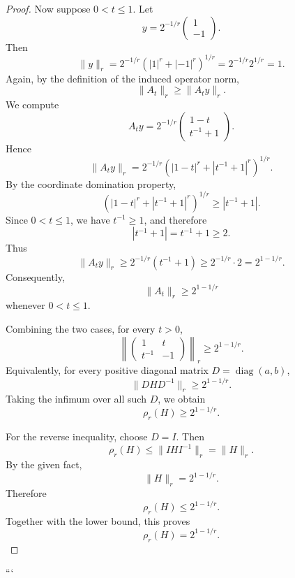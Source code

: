 \begin{proof}
Now suppose \(0<t\leq 1\). Let
\[
y=2^{-1/r}\begin{pmatrix}1\\-1\end{pmatrix}.
\]
Then
\[
\|y\|_r
=
2^{-1/r}\left(|1|^r+|-1|^r\right)^{1/r}
=
2^{-1/r}2^{1/r}
=
1.
\]
Again, by the definition of the induced operator norm,
\[
\|A_t\|_r \geq \|A_t y\|_r.
\]
We compute
\[
A_t y
=
2^{-1/r}
\begin{pmatrix}
1-t\\
t^{-1}+1
\end{pmatrix}.
\]
Hence
\[
\|A_t y\|_r
=
2^{-1/r}
\left(|1-t|^r+|t^{-1}+1|^r\right)^{1/r}.
\]
By the coordinate domination property,
\[
\left(|1-t|^r+|t^{-1}+1|^r\right)^{1/r}
\geq |t^{-1}+1|.
\]
Since \(0<t\leq 1\), we have \(t^{-1}\geq 1\), and therefore
\[
|t^{-1}+1|=t^{-1}+1\geq 2.
\]
Thus
\[
\|A_t y\|_r
\geq
2^{-1/r}(t^{-1}+1)
\geq
2^{-1/r}\cdot 2
=
2^{1-1/r}.
\]
Consequently,
\[
\|A_t\|_r \geq 2^{1-1/r}
\]
whenever \(0<t\leq 1\).

Combining the two cases, for every \(t>0\),
\[
\left\|
\begin{pmatrix}
1 & t\\
t^{-1} & -1
\end{pmatrix}
\right\|_r
\geq
2^{1-1/r}.
\]
Equivalently, for every positive diagonal matrix \(D=\operatorname{diag}(a,b)\),
\[
\|DHD^{-1}\|_r \geq 2^{1-1/r}.
\]
Taking the infimum over all such \(D\), we obtain
\[
\rho_r(H)\geq 2^{1-1/r}.
\]

For the reverse inequality, choose \(D=I\). Then
\[
\rho_r(H)
\leq
\|IHI^{-1}\|_r
=
\|H\|_r.
\]
By the given fact,
\[
\|H\|_r=2^{1-1/r}.
\]
Therefore
\[
\rho_r(H)\leq 2^{1-1/r}.
\]
Together with the lower bound, this proves
\[
\rho_r(H)=2^{1-1/r}.
\]
\end{proof}
```